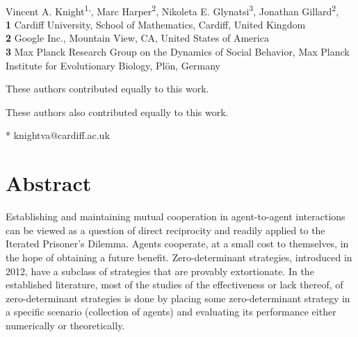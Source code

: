 \documentclass[10pt,letterpaper]{article}
\begin{document}
\vspace*{0.2in}

\begin{flushleft}
{\Large
\textbf{} %
}
\newline
\\
Vincent A. Knight\textsuperscript{1,\Yinyang *},
Marc Harper\textsuperscript{2\Yinyang},
Nikoleta E. Glynatsi\textsuperscript{3\Yinyang},
Jonathan Gillard\textsuperscript{2\ddag},
\\
\bigskip
\textbf{1} Cardiff University, School of Mathematics, Cardiff, United Kingdom
\\
\textbf{2} Google Inc., Mountain View, CA, United States of America
\\
\textbf{3} Max Planck Research Group on the Dynamics of Social Behavior, Max Planck Institute for Evolutionary Biology, Pl\"on, Germany
\\
\bigskip

% 
%
\Yinyang These authors contributed equally to this work.

\ddag These authors also contributed equally to this work.

* knightva@cardiff.ac.uk

\end{flushleft}
\section*{Abstract}
Establishing and maintaining mutual cooperation in agent-to-agent interactions
can be viewed as a question of direct reciprocity and
readily applied to the Iterated Prisoner's Dilemma. Agents cooperate, at a
small cost to themselves, in the hope of obtaining a future benefit.
Zero-determinant strategies, introduced in 2012, have a subclass of
strategies that are provably extortionate. In the established literature,
most of the studies of the effectiveness or lack
thereof, of zero-determinant strategies is done by placing some
zero-determinant strategy in a specific scenario (collection of agents) and
evaluating its performance either numerically or theoretically.
\end{document}
